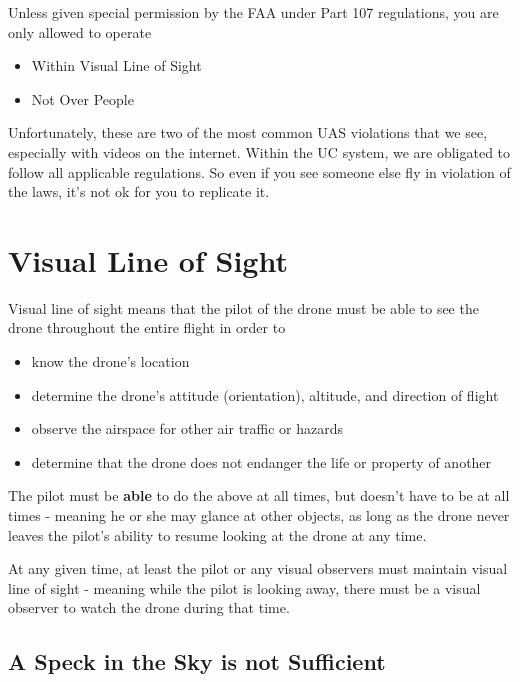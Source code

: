 \documentclass[
]{book}
\providecommand{\tightlist}{%
  \setlength{\itemsep}{0pt}\setlength{\parskip}{0pt}}
\begin{document}
Unless given special permission by the FAA under Part 107 regulations, you are only allowed to operate

\begin{itemize}
\tightlist
\item
  Within Visual Line of Sight
\item
  Not Over People
\end{itemize}

Unfortunately, these are two of the most common UAS violations that we see, especially with videos on the internet. Within the UC system, we are obligated to follow all applicable regulations. So even if you see someone else fly in violation of the laws, it's not ok for you to replicate it.

\hypertarget{visual-line-of-sight}{%
\section{Visual Line of Sight}\label{visual-line-of-sight}}

Visual line of sight means that the pilot of the drone must be able to see the drone throughout the entire flight in order to

\begin{itemize}
\tightlist
\item
  know the drone's location
\item
  determine the drone's attitude (orientation), altitude, and direction of flight
\item
  observe the airspace for other air traffic or hazards
\item
  determine that the drone does not endanger the life or property of another
\end{itemize}

The pilot must be \textbf{able} to do the above at all times, but doesn't have to be at all times - meaning he or she may glance at other objects, as long as the drone never leaves the pilot's ability to resume looking at the drone at any time.

At any given time, at least the pilot or any visual observers must maintain visual line of sight - meaning while the pilot is looking away, there must be a visual observer to watch the drone during that time.

\hypertarget{a-speck-in-the-sky-is-not-sufficient}{%
\subsection{A Speck in the Sky is not Sufficient}\label{a-speck-in-the-sky-is-not-sufficient}}
\end{document}
